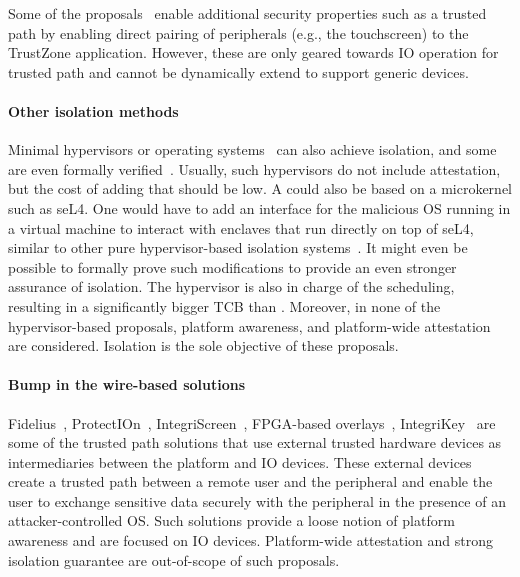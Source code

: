 Some of the proposals~\cite{TruZ-Droid,trustUI,SeCloak,VButton} enable additional security properties such as a trusted path by enabling direct pairing of peripherals (e.g., the touchscreen) to the TrustZone application. However, these are only geared towards IO operation for trusted path and cannot be dynamically extend to support generic devices.

\paragraph{Other isolation methods} Minimal hypervisors or operating systems~\cite{herder2006minix,klein2009sel4} can also achieve isolation, and some are even formally verified~\cite{klein2009sel4}. Usually, such hypervisors do not include attestation, but the cost of adding that should be low. A \name{} could also be based on a microkernel such as seL4. One would have to add an interface for the malicious OS running in a virtual machine to interact with enclaves that run directly on top of seL4, similar to other pure hypervisor-based isolation systems~\cite{virtualGhost,Overshadow,InkTag,TrustVisor,SplittingInterfaces,terra}. It might even be possible to formally prove such modifications to provide an even stronger assurance of isolation. 
The hypervisor is also in charge of the scheduling, resulting in a significantly bigger TCB than \name. Moreover, in none of the hypervisor-based proposals, platform awareness, and platform-wide attestation are considered. Isolation is the sole objective of these proposals.

\paragraph{Bump in the wire-based solutions} Fidelius~\cite{fidelius}, ProtectIOn~\cite{protection}, IntegriScreen~\cite{integriscreen}, FPGA-based overlays~\cite{fpga_overlay}, IntegriKey~\cite{integrikey} are some of the trusted path solutions that use external trusted hardware devices as intermediaries between the platform and IO devices. These external devices create a trusted path between a remote user and the peripheral and enable the user to exchange sensitive data securely with the peripheral in the presence of an attacker-controlled OS. Such solutions provide a loose notion of platform awareness and are focused on IO devices. Platform-wide attestation and strong isolation guarantee are out-of-scope of such proposals. 

